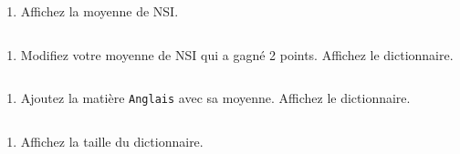 \documentclass[12pt]{book}
\begin{document}
\begin{enumerate}
\def\labelenumi{\arabic{enumi}.}
\tightlist
\item
  Affichez la moyenne de NSI.
\end{enumerate}

    \begin{tcolorbox}[breakable, size=fbox, boxrule=1pt, pad at break*=1mm,colback=cellbackground, colframe=cellborder]
\begin{Verbatim}[commandchars=\\\{\}]

\end{Verbatim}
\end{tcolorbox}

    \begin{enumerate}
\def\labelenumi{\arabic{enumi}.}
\setcounter{enumi}{1}
\tightlist
\item
  Modifiez votre moyenne de NSI qui a gagné 2 points. Affichez le
  dictionnaire.
\end{enumerate}

    \begin{tcolorbox}[breakable, size=fbox, boxrule=1pt, pad at break*=1mm,colback=cellbackground, colframe=cellborder]
\begin{Verbatim}[commandchars=\\\{\}]

\end{Verbatim}
\end{tcolorbox}

    \begin{enumerate}
\def\labelenumi{\arabic{enumi}.}
\setcounter{enumi}{2}
\tightlist
\item
  Ajoutez la matière \texttt{Anglais} avec sa moyenne. Affichez le
  dictionnaire.
\end{enumerate}

    \begin{tcolorbox}[breakable, size=fbox, boxrule=1pt, pad at break*=1mm,colback=cellbackground, colframe=cellborder]
\begin{Verbatim}[commandchars=\\\{\}]

\end{Verbatim}
\end{tcolorbox}

    \begin{enumerate}
\def\labelenumi{\arabic{enumi}.}
\setcounter{enumi}{3}
\tightlist
\item
  Affichez la taille du dictionnaire.
\end{enumerate}
\end{document}
